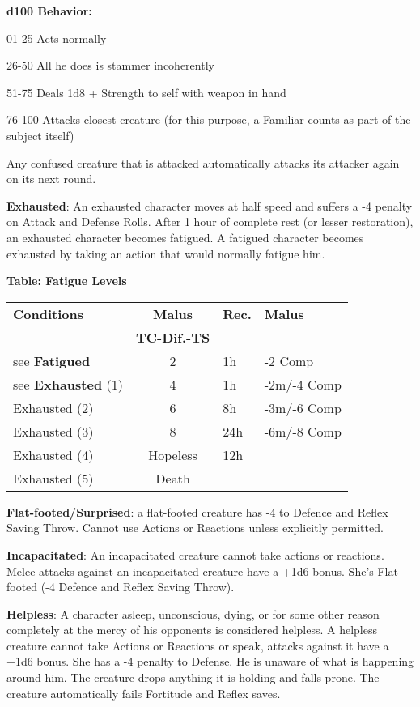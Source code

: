 \documentclass[a4paper,12 pt,openany]{book}
\begin{document}
\begin{textblock*}{19 cm}
\begin{multicols}{2}
\textbf{d100 Behavior:}

01-25 Acts normally

26-50 All he does is stammer incoherently

51-75 Deals 1d8 + Strength to self with weapon in hand

76-100 Attacks closest creature (for this purpose, a Familiar counts as part of the subject itself)

Any confused creature that is attacked automatically attacks its attacker again on its next round.

\textbf{Exhausted}: An exhausted character moves at half speed and suffers a -4 penalty on Attack and Defense Rolls. After 1 hour of complete rest (or lesser restoration), an exhausted character becomes fatigued. A fatigued character becomes exhausted by taking an action that would normally fatigue him.

\medskip

\textbf{Table: Fatigue Levels}

\medskip

\begin{tabularx}{0.45\textwidth}{lcll}
\textbf{Conditions}& \textbf{Malus}&\textbf{Rec.}&\textbf{Malus}\\
&\textbf{TC-Dif.-TS}&&\\
\hline
see \textbf{Fatigued}&2&1h&-2 Comp\\
see \textbf{Exhausted} (1)&4&1h&-2m/-4 Comp\\
Exhausted (2) &6&8h&-3m/-6 Comp\\
Exhausted (3) &8&24h&-6m/-8 Comp\\
Exhausted (4) &Hopeless&12h&\\
Exhausted (5) &Death&&\\
\end{tabularx}

\textbf{Flat-footed/Surprised}: a flat-footed creature has -4 to Defence and Reflex Saving Throw. Cannot use Actions or Reactions unless explicitly permitted.

\textbf{Incapacitated}: An incapacitated creature cannot take actions or reactions. Melee attacks against an incapacitated creature have a +1d6 bonus. She's Flat-footed (-4 Defence and Reflex Saving Throw).

\textbf{Helpless}: A character asleep, unconscious, dying, or for some other reason completely at the mercy of his opponents is considered helpless.
A helpless creature cannot take Actions or Reactions or speak, attacks against it have a +1d6 bonus. She has a -4 penalty to Defense. He is unaware of what is happening around him. The creature drops anything it is holding and falls prone.
The creature automatically fails Fortitude and Reflex saves.


\end{multicols}
\end{textblock*}
\end{document}

